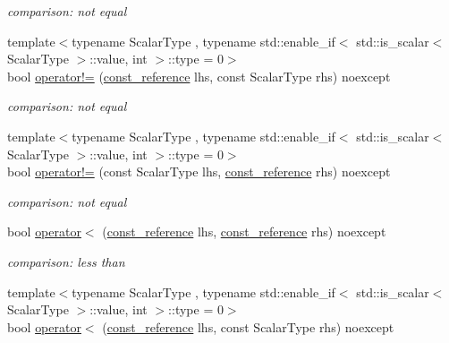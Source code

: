 \begin{DoxyCompactItemize}
\begin{DoxyCompactList}\small\item\em comparison\+: not equal \end{DoxyCompactList}\item 
{\footnotesize template$<$typename Scalar\+Type , typename std\+::enable\+\_\+if$<$ std\+::is\+\_\+scalar$<$ Scalar\+Type $>$\+::value, int $>$\+::type  = 0$>$ }\\bool \mbox{\hyperlink{classnlohmann_1_1basic__json_afefc38fc08bdb7a9a7474b5ab4a1140f}{operator!=}} (\mbox{\hyperlink{classnlohmann_1_1basic__json_a4057c5425f4faacfe39a8046871786ca}{const\+\_\+reference}} lhs, const Scalar\+Type rhs) noexcept
\begin{DoxyCompactList}\small\item\em comparison\+: not equal \end{DoxyCompactList}\item 
{\footnotesize template$<$typename Scalar\+Type , typename std\+::enable\+\_\+if$<$ std\+::is\+\_\+scalar$<$ Scalar\+Type $>$\+::value, int $>$\+::type  = 0$>$ }\\bool \mbox{\hyperlink{classnlohmann_1_1basic__json_ab0e886db6e9fa91ff9fd853333fed05b}{operator!=}} (const Scalar\+Type lhs, \mbox{\hyperlink{classnlohmann_1_1basic__json_a4057c5425f4faacfe39a8046871786ca}{const\+\_\+reference}} rhs) noexcept
\begin{DoxyCompactList}\small\item\em comparison\+: not equal \end{DoxyCompactList}\item 
bool \mbox{\hyperlink{classnlohmann_1_1basic__json_aacd442b66140c764c594ac8ad7dfd5b3}{operator$<$}} (\mbox{\hyperlink{classnlohmann_1_1basic__json_a4057c5425f4faacfe39a8046871786ca}{const\+\_\+reference}} lhs, \mbox{\hyperlink{classnlohmann_1_1basic__json_a4057c5425f4faacfe39a8046871786ca}{const\+\_\+reference}} rhs) noexcept
\begin{DoxyCompactList}\small\item\em comparison\+: less than \end{DoxyCompactList}\item 
{\footnotesize template$<$typename Scalar\+Type , typename std\+::enable\+\_\+if$<$ std\+::is\+\_\+scalar$<$ Scalar\+Type $>$\+::value, int $>$\+::type  = 0$>$ }\\bool \mbox{\hyperlink{classnlohmann_1_1basic__json_a7999ee3a69a4979d92e98ab1e88c8759}{operator$<$}} (\mbox{\hyperlink{classnlohmann_1_1basic__json_a4057c5425f4faacfe39a8046871786ca}{const\+\_\+reference}} lhs, const Scalar\+Type rhs) noexcept

\end{DoxyCompactItemize}
